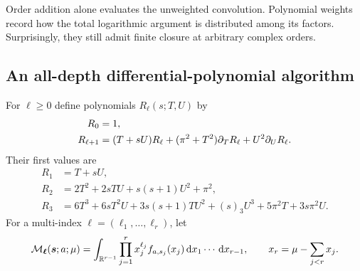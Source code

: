 \documentclass[11pt,a4paper]{article}
\numberwithin{equation}{section}
\theoremstyle{definition}\newtheorem{definition}[theorem]{Definition}
\theoremstyle{remark}\newtheorem{remark}[theorem]{Remark}
\newcommand{\dd}{\,\mathrm d}
\newcommand{\MM}{\mathcal M}
\begin{document}
Order addition alone evaluates the unweighted convolution. Polynomial
weights record how the total logarithmic argument is distributed among
its factors. Surprisingly, they still admit finite closure at arbitrary
complex orders.

\subsection{An all-depth differential-polynomial algorithm}
For $\ell\ge0$ define polynomials $R_\ell(s;T,U)$ by
\begin{align}
 R_0&=1,\notag\\
 R_{\ell+1}&=(T+sU)R_\ell+(\pi^2+T^2)\partial_T R_\ell
                        +U^2\partial_U R_\ell.
 \label{rlc:eq:Rrecurrence}
\end{align}
Their first values are
\begin{align*}
 R_1&=T+sU,\\
 R_2&=2T^2+2sTU+s(s+1)U^2+\pi^2,\\
 R_3&=6T^3+6sT^2U+3s(s+1)TU^2+(s)_3U^3
          +5\pi^2T+3s\pi^2U.
\end{align*}
For a multi-index $\boldsymbol\ell=(\ell_1,\ldots,\ell_r)$, let
\begin{equation}\label{rlc:eq:weighteddef}
 \MM_{\boldsymbol\ell}(\boldsymbol s;a;\mu)
 =\int_{\R^{r-1}}\prod_{j=1}^r
     x_j^{\ell_j}f_{a,s_j}(x_j)\dd x_1\cdots\dd x_{r-1},
 \qquad x_r=\mu-\sum_{j<r}x_j.
\end{equation}
\end{document}
